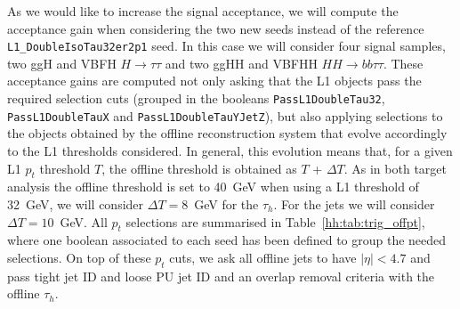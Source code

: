 \documentclass[../main.tex]{subfiles}
\begin{document}
As we would like to increase the signal acceptance, we will compute the acceptance gain when considering the two new seeds instead of the reference \texttt{L1\_Double\-IsoTau32\-er2p1} seed. In this case we will consider four signal samples, two ggH and VBFH $H\to\tau\tau$ and two ggHH and VBFHH $HH\to bb\tau\tau$. These acceptance gains are computed not only asking that the L1 objects pass the required selection cuts (grouped in the booleans \texttt{PassL1DoubleTau32}, \texttt{PassL1DoubleTauX} and \texttt{PassL1DoubleTauYJetZ}), but also applying selections to the objects obtained by the offline reconstruction system that evolve accordingly to the L1 thresholds considered. In general, this evolution means that, for a given L1 $p_t$ threshold $T$, the offline threshold is obtained as $T$ + $\Delta T$. As in both target analysis the offline threshold is set to 40~GeV when using a L1 threshold of 32~GeV, we will consider $\Delta T=8$~GeV for the $\tau_h$. For the jets we will consider $\Delta T=10$~GeV. All $p_t$ selections are summarised in Table~\ref{hh:tab:trig_offpt}, where one boolean associated to each seed has been defined to group the needed selections. On top of these $p_t$ cuts, we ask all offline jets to have $|\eta|<4.7$ and pass tight jet ID and loose PU jet ID and an overlap removal criteria with the offline $\tau_h$.
\end{document}
